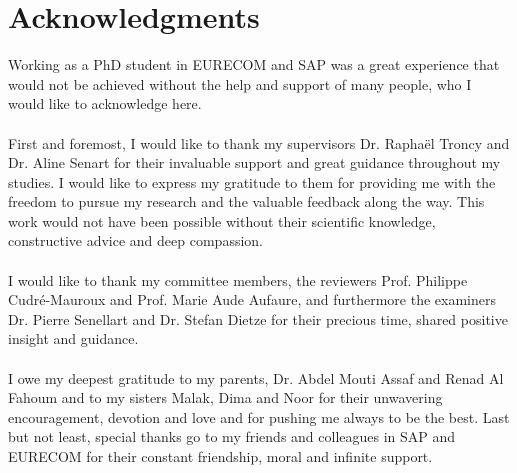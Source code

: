 \chapter*{Acknowledgments}

Working as a PhD student in EURECOM and SAP was a great experience that would not be achieved without the help and support of many people, who I would like to acknowledge here.
\\
\\
First and foremost, I would like to thank my supervisors Dr. Rapha\"el Troncy and Dr. Aline Senart for their invaluable support and great guidance throughout my studies. I would like to express my gratitude to them for providing me with the freedom to pursue my research and the valuable feedback along the way. This work would not have been possible without their scientific knowledge, constructive advice and deep compassion.
\\
\\
I would like to thank my committee members, the reviewers Prof. Philippe Cudr\'{e}-Mauroux  and Prof. Marie Aude Aufaure, and furthermore the examiners Dr. Pierre Senellart and Dr. Stefan Dietze for their precious time, shared positive insight and guidance.
\\
\\
I owe my deepest gratitude to my parents, Dr. Abdel Mouti Assaf and Renad Al Fahoum and to my sisters Malak, Dima and Noor for their unwavering encouragement, devotion and love and for pushing me always to be the best.  Last but not least, special thanks go to my friends and colleagues in SAP and EURECOM for their constant friendship, moral and infinite support.
